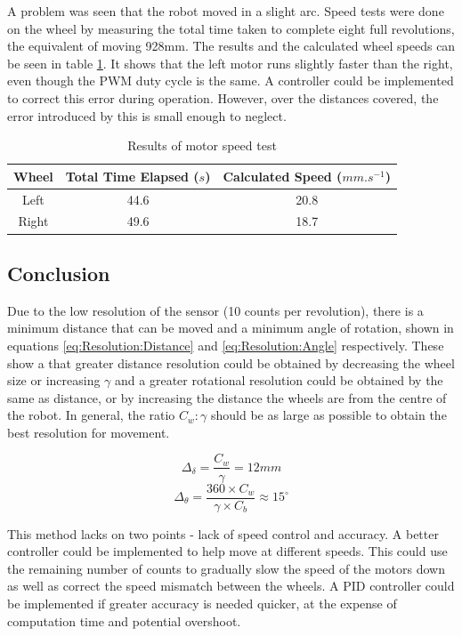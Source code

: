 A problem was seen that the robot moved in a slight arc. Speed tests were done on the wheel by measuring the total time taken to complete eight full revolutions, the equivalent of moving 928mm. The results and the calculated wheel speeds can be seen in table \ref{table:results:motor:speed}. It shows that the left motor runs slightly faster than the right, even though the PWM duty cycle is the same. A controller could be implemented to correct this error during operation. However, over the distances covered, the error introduced by this is small enough to neglect. 

\begin{table}
\caption{Results of motor speed test}
\label{table:results:motor:speed}
\centering
\begin{tabular}{ccc} \toprule
Wheel &	Total Time Elapsed ($s$) & Calculated Speed ($mm.s^{-1}$) \\ \toprule
Left & 44.6		&	20.8 \\ \midrule
Right & 49.6	&	18.7 \\ \bottomrule
\end{tabular}
\end{table}

\subsection{Conclusion}
Due to the low resolution of the sensor (10 counts per revolution), there is a minimum distance that can be moved and a minimum angle of rotation, shown in equations \eqref{eq:Resolution:Distance} and \eqref{eq:Resolution:Angle} respectively. These show a that greater distance resolution could be obtained by decreasing the wheel size or increasing $\gamma$ and a greater rotational resolution could be obtained by the same as distance, or by increasing the distance the wheels are from the centre of the robot. In general, the ratio $C_w:\gamma$ should be as large as possible to obtain the best resolution for movement.


\begin{equation}\label{eq:Resolution:Distance}
\Delta_{\delta} = \frac{C_w}{\gamma} = 12mm
\end{equation}
\begin{equation}\label{eq:Resolution:Angle}
\Delta_{\theta} = \frac{360 \times C_w}{\gamma \times C_b} \approx 15^\circ 
\end{equation}

This method lacks on two points - lack of speed control and accuracy.
A better controller could be implemented to help move at different speeds. This could use the remaining number of counts to gradually slow the speed of the motors down as well as correct the speed mismatch between the wheels. A PID controller could be implemented if greater accuracy is needed quicker, at the expense of computation time and potential overshoot. 

